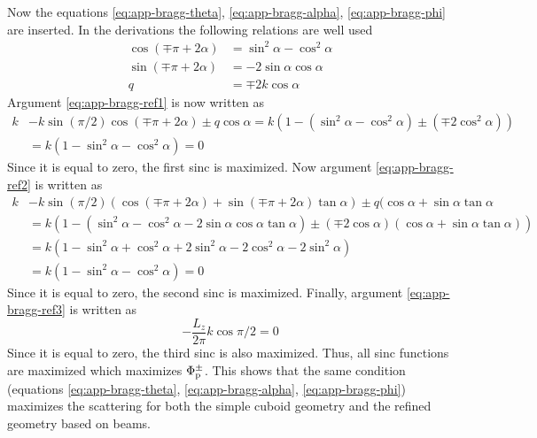 \documentclass[11pt,twoside]{eitExjobb}
\begin{document}
Now the equations \eqref{eq:app-bragg-theta}, \eqref{eq:app-bragg-alpha}, \eqref{eq:app-bragg-phi} are inserted. In the derivations the following relations are well used
\begin{align*}
	\cos(\mp \pi + 2\alpha) &= \sin^2{\alpha} - \cos^2{\alpha} \\
	\sin(\mp \pi + 2\alpha) &= -2\sin{\alpha}\cos{\alpha} \\
	q &= \mp 2k\cos{\alpha}
\end{align*}
Argument \eqref{eq:app-bragg-ref1} is now written as
\begin{equation*}
\begin{split}
	k &- k\sin(\pi/2)\cos(\mp \pi + 2\alpha) \pm q\cos{\alpha} = k \left( 1 - (\sin^2{\alpha} - \cos^2{\alpha}) \pm (\mp 2\cos^2{\alpha}) \right) \\
	&= k \left( 1 - \sin^2{\alpha} - \cos^2{\alpha} \right) = 0
\end{split}
\end{equation*}
Since it is equal to zero, the first sinc is maximized. Now argument \eqref{eq:app-bragg-ref2} is written as
\begin{equation*}
\begin{split}
	k &- k\sin(\pi/2)(\cos(\mp \pi + 2\alpha) + \sin(\mp \pi + 2\alpha)\tan{\alpha}) \pm q(\cos{\alpha} + \sin{\alpha}\tan{\alpha} \\
	&= k \left( 1 - (\sin^2{\alpha} - \cos^2{\alpha} - 2\sin{\alpha}\cos{\alpha}\tan{\alpha}) \pm (\mp 2\cos{\alpha})(\cos{\alpha} + \sin{\alpha}\tan{\alpha}) \right) \\
	&= k \left( 1 - \sin^2{\alpha} + \cos^2{\alpha} + 2\sin^2{\alpha} - 2\cos^2{\alpha} - 2\sin^2{\alpha} \right) \\
	&= k \left( 1 - \sin^2{\alpha} - \cos^2{\alpha} \right) = 0
\end{split}
\end{equation*}
Since it is equal to zero, the second sinc is maximized. Finally, argument \eqref{eq:app-bragg-ref3} is written as
\begin{equation*}
	-\frac{L_{z}}{2\pi} k\cos{\pi/2} = 0
\end{equation*}
Since it is equal to zero, the third sinc is also maximized. Thus, all sinc functions are maximized which maximizes $\Phi_{\mathrm{p}}^{\pm}$. This shows that the same condition (equations \eqref{eq:app-bragg-theta}, \eqref{eq:app-bragg-alpha}, \eqref{eq:app-bragg-phi}) maximizes the scattering for both the simple cuboid geometry and the refined geometry based on beams.
	
\end{document}
